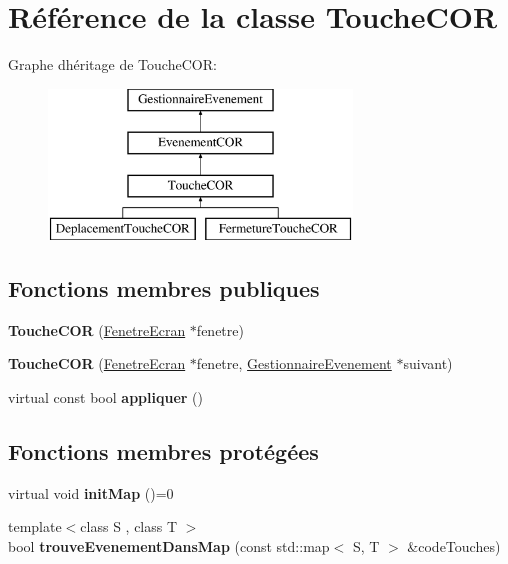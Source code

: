 \hypertarget{class_touche_c_o_r}{}\section{Référence de la classe Touche\+C\+OR}
\label{class_touche_c_o_r}
Graphe d\textquotesingle{}héritage de Touche\+C\+OR\+:\begin{figure}[H]
\begin{center}
\leavevmode
\includegraphics[height=4.000000cm]{class_touche_c_o_r}
\end{center}
\end{figure}
\subsection*{Fonctions membres publiques}
\begin{DoxyCompactItemize}
\item 
\mbox{\label{class_touche_c_o_r_a2e876ba91f2545d8c245336e442744ba}} 
{\bfseries Touche\+C\+OR} (\mbox{\hyperlink{class_fenetre_ecran}{Fenetre\+Ecran}} $\ast$fenetre)
\item 
\mbox{\label{class_touche_c_o_r_af3fc788ba83fd5d00f8fdd890e6c095d}} 
{\bfseries Touche\+C\+OR} (\mbox{\hyperlink{class_fenetre_ecran}{Fenetre\+Ecran}} $\ast$fenetre, \mbox{\hyperlink{class_gestionnaire_evenement}{Gestionnaire\+Evenement}} $\ast$suivant)
\item 
\mbox{\label{class_touche_c_o_r_a27641bba73bb7dcd7101a1dea8623e60}} 
virtual const bool {\bfseries appliquer} ()
\end{DoxyCompactItemize}
\subsection*{Fonctions membres protégées}
\begin{DoxyCompactItemize}
\item 
\mbox{\label{class_touche_c_o_r_ad4f62c88d0b4b120aa240c3c08e373cb}} 
virtual void {\bfseries init\+Map} ()=0
\item 
\mbox{\label{class_touche_c_o_r_add0aa3a8135822eda986ca3bd7986fd0}} 
{\footnotesize template$<$class S , class T $>$ }\\bool {\bfseries trouve\+Evenement\+Dans\+Map} (const std\+::map$<$ S, T $>$ \&code\+Touches)
\end{DoxyCompactItemize}

